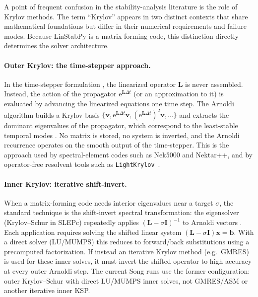 \documentclass[11pt]{article}
\newcommand{\bx}{\mathbf{x}}
\newcommand{\bI}{\mathbf{I}}
\newcommand{\bL}{\mathbf{L}}
\newcommand{\bv}{\mathbf{v}}
\newcommand{\bb}{\mathbf{b}}
\begin{document}
A point of frequent confusion in the stability-analysis literature is the role
of Krylov methods. The term ``Krylov'' appears in two distinct contexts that
share mathematical foundations but differ in their numerical requirements and
failure modes. Because LinStabPy is a matrix-forming code, this distinction
directly determines the solver architecture.

\paragraph{Outer Krylov: the time-stepper approach.}
In the time-stepper formulation
\citep{edwards1994krylov,barkley2008direct,frantz2023krylov}, the linearized
operator $\bL$ is never assembled. Instead, the action of the propagator
$\mathrm{e}^{\bL \Delta t}$ (or an approximation to it) is evaluated by
advancing the linearized equations one time step. The Arnoldi algorithm builds
a Krylov basis $\{\bv, \mathrm{e}^{\bL\Delta t}\bv,
(\mathrm{e}^{\bL\Delta t})^2 \bv, \ldots\}$ and extracts the dominant
eigenvalues of the propagator, which correspond to the least-stable temporal
modes \citep{lehoucq1998arpack}. No matrix is stored, no system is inverted,
and the Arnoldi recurrence operates on the smooth output of the time-stepper.
This is the approach used by spectral-element codes such as Nek5000 and
Nektar++, and by operator-free resolvent tools such as
\texttt{LightKrylov}~\citep{kern2026lightkrylov}.

\paragraph{Inner Krylov: iterative shift-invert.}
When a matrix-forming code needs interior eigenvalues near a target $\sigma$,
the standard technique is the shift-invert spectral transformation:
the eigensolver (Krylov--Schur in SLEPc) repeatedly applies
$(\bL - \sigma\bI)^{-1}$ to Arnoldi vectors
\citep{hernandez2005slepc,lehoucq1998arpack}. Each application requires
solving the shifted linear system $(\bL - \sigma\bI)\bx = \bb$. With a
direct solver (LU/MUMPS) this reduces to forward/back substitutions using
a precomputed factorization. If instead an iterative Krylov method (e.g.\
GMRES) is used for these inner solves, it must invert the shifted operator
to high accuracy at every outer Arnoldi step. The current Song runs use the
former configuration: outer Krylov--Schur with direct LU/MUMPS inner solves,
not GMRES/ASM or another iterative inner KSP.
\end{document}
